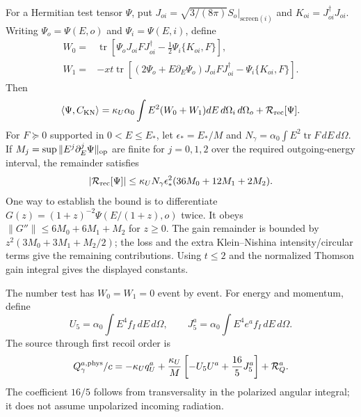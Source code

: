 For a Hermitian test tensor $\Psi$, put
$J_{oi}=\sqrt{3/(8\pi)}S_o|_{\mathrm{screen}(i)}$ and
$K_{oi}=J_{oi}^\dagger J_{oi}$. Writing $\Psi_o=\Psi(E,o)$ and $\Psi_i=\Psi(E,i)$, define
\begin{align}
 W_0={}&\operatorname{tr}\left[\Psi_oJ_{oi}FJ_{oi}^\dagger
                        -\tfrac12\Psi_i\{K_{oi},F\}\right],\nonumber\\
 W_1={}&-xt\operatorname{tr}\left[(2\Psi_o+E\partial_E\Psi_o)J_{oi}FJ_{oi}^\dagger
                                  -\Psi_i\{K_{oi},F\}\right].
 \label{ii:recoil_weak_terms}
\end{align}
Then
\begin{equation}
 \langle\Psi,C_{\rm KN}\rangle
   =\kappa_U\alpha_0\int E^2(W_0+W_1)dE\,d\Omega_i\,d\Omega_o
                  +\mathcal R_{\rm rec}[\Psi].
 \label{ii:recoil_weak}
\end{equation}
For $F\succeq0$ supported in $0<E\le E_*$, let
$\epsilon_*=E_*/M$ and $N_\gamma=\alpha_0\int E^2\operatorname{tr}F\,dE\,d\Omega$.
If $M_j=\sup\|E^j\partial_E^j\Psi\|_{\rm op}$ are finite for $j=0,1,2$ over the required outgoing-energy interval, the remainder satisfies
\begin{equation}
 |\mathcal R_{\rm rec}[\Psi]|
 \le\kappa_UN_\gamma\epsilon_*^2(36M_0+12M_1+2M_2).
 \label{ii:recoil_bound}
\end{equation}
One way to establish the bound is to differentiate
$G(z)=(1+z)^{-2}\Psi(E/(1+z),o)$ twice. It obeys
$\|G''\|\le6M_0+6M_1+M_2$ for $z\ge0$. The gain remainder is bounded by $z^2(3M_0+3M_1+M_2/2)$; the loss and the extra Klein--Nishina intensity/circular terms give the remaining contributions. Using $t\le2$ and the normalized Thomson gain integral gives the displayed constants.

The number test has $W_0=W_1=0$ event by event. For energy and momentum, define
\begin{equation}
 U_5=\alpha_0\int E^4f_I\,dE\,d\Omega,
 \qquad J_5^a=\alpha_0\int E^4e^af_I\,dE\,d\Omega.
 \label{ii:recoil_moments}
\end{equation}
The source through first recoil order is
\begin{equation}
 Q_\gamma^{a,\rm phys}/c=-\kappa_Uq_U^a
 +\frac{\kappa_U}{M}\left[-U_5U^a+\frac{16}{5}J_5^a\right]
 +\mathcal R_Q^a.
 \label{ii:recoil_force}
\end{equation}
The coefficient $16/5$ follows from transversality in the polarized angular integral; it does not assume unpolarized incoming radiation.

